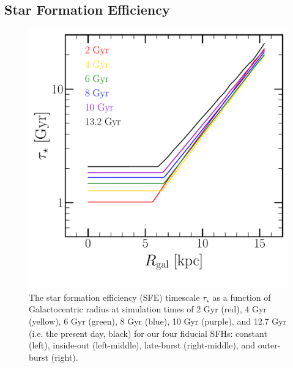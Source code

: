 \documentclass[a4paper, fleqn, usenatbib, useAMS]{mnras}
\begin{document}
\subsection{Star Formation Efficiency} 
\label{sec:methods:sfe} 

\begin{figure} 
\centering 
\includegraphics[scale = 0.32]{sfe.pdf} 
\caption{The star formation efficiency (SFE) timescale $\tau_\star$ as a 
function of Galactocentric radius at simulation times of 2 Gyr (red), 4 Gyr 
(yellow), 6 Gyr (green), 8 Gyr (blue), 10 Gyr (purple), and 12.7 Gyr (i.e. 
the present day, black) for our four fiducial SFHs: constant (left), inside-out 
(left-middle), late-burst (right-middle), and outer-burst (right). }
\label{fig:sfe} 
\end{figure} 
\end{document}
